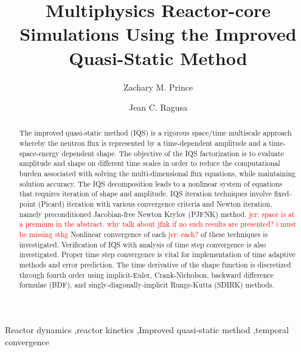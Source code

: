\documentclass{elsarticle}
\newcommand{\jcr}[1]{\textcolor{red}{jcr: #1}}
\begin{document}
\begin{frontmatter}


\title{Multiphysics Reactor-core Simulations Using the Improved Quasi-Static Method}


\author[tamu]{Zachary M. Prince}

\author[tamu]{Jean C. Ragusa}

\address[tamu]{Texas A\&M University,
  Department of Nuclear Engineering,
  College Station, TX 77840, USA}

\begin{abstract}
The improved quasi-static method (IQS) is a rigorous space/time multiscale approach whereby the neutron flux is represented by a time-dependent 
amplitude and a time-space-energy dependent shape. The objective of the IQS factorization is to evaluate amplitude and shape on different time scales 
in order to reduce the computational burden associated with solving the multi-dimensional flux equations, while maintaining solution accuracy. 
The IQS decomposition leads to a nonlinear system of equations that requires iteration of shape and amplitude. IQS iteration techniques involve 
fixed-point (Picard) iteration with various convergence criteria and Newton iteration, namely preconditioned Jacobian-free Newton Krylov (PJFNK) method. 
\jcr{space is at a premium in the abstract. why talk about jfnk if no such results are presented? i must be missing sthg}
Nonlinear convergence of each \jcr{each?} of these techniques is investigated. Verification of IQS with analysis of time step convergence is also investigated. 
Proper time step convergence is vital for implementation of time adaptive methods and error prediction. The time derivative of the shape function is 
discretized through fourth order using implicit-Euler, Crank-Nicholson, backward difference formulae (BDF), and singly-diagonally-implicit 
Runge-Kutta (SDIRK) methods.
\end{abstract}

\begin{keyword}
Reactor dynamics \sep reactor kinetics \sep Improved quasi-static method \sep temporal convergence 
\end{keyword}

\end{frontmatter}
\end{document}
